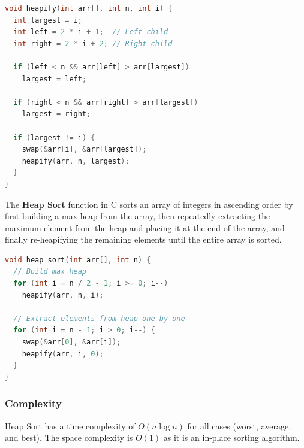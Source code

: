 \documentclass{article}
\begin{document}
\newpage
\begin{lstlisting}[language=C, caption=Heapify implementation]
void heapify(int arr[], int n, int i) {
  int largest = i;
  int left = 2 * i + 1;  // Left child
  int right = 2 * i + 2; // Right child

  if (left < n && arr[left] > arr[largest])
    largest = left;

  if (right < n && arr[right] > arr[largest])
    largest = right;

  if (largest != i) {
    swap(&arr[i], &arr[largest]);
    heapify(arr, n, largest);
  }
}
\end{lstlisting}

The \textbf{Heap Sort} function in C sorts an array of integers in ascending order by first building a max heap from the array, then repeatedly extracting the maximum element from the heap and placing it at the end of the array, and finally re-heapifying the remaining elements until the entire array is sorted.

\begin{lstlisting}[language=C, caption=Heap Sort implementation]
void heap_sort(int arr[], int n) {
  // Build max heap
  for (int i = n / 2 - 1; i >= 0; i--)
    heapify(arr, n, i);

  // Extract elements from heap one by one
  for (int i = n - 1; i > 0; i--) {
    swap(&arr[0], &arr[i]);
    heapify(arr, i, 0);
  }
}
\end{lstlisting}

\subsubsection{Complexity}
Heap Sort has a time complexity of $O(n \log n)$ for all cases (worst, average, and best). The space complexity is $O(1)$ as it is an in-place sorting algorithm.
\end{document}
